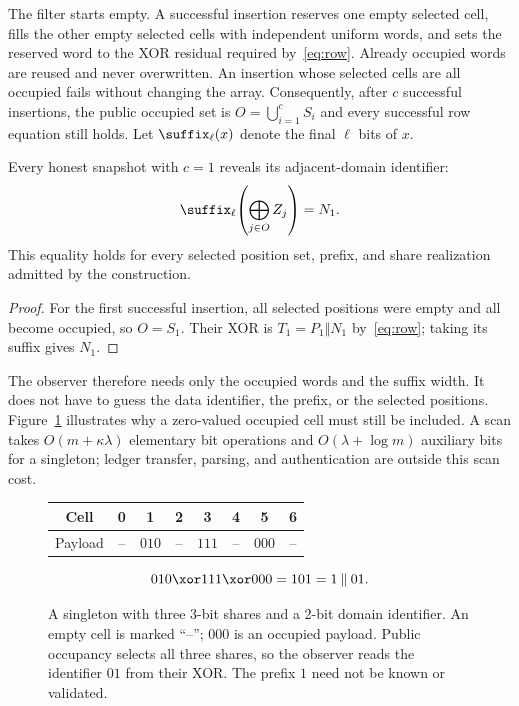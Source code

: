The filter starts empty. A successful insertion reserves one empty selected
cell, fills the other empty selected cells with independent uniform words,
and sets the reserved word to the XOR residual required by~\eqref{eq:row}.
Already occupied words are reused and never overwritten. An insertion whose
selected cells are all occupied fails without changing the array. Consequently,
after $c$ successful insertions, the public occupied set is
$O=\bigcup_{i=1}^{c}S_i$ and every successful row equation still holds.
Let $\suffix_\ell(x)$ denote the final $\ell$ bits of $x$.

\begin{proposition}
\label{prop:singleton}
Every honest snapshot with $c=1$ reveals its adjacent-domain identifier:
\begin{equation}
  \suffix_\ell\!\left(\bigoplus_{j\in O}Z_j\right)=N_1.
  \label{eq:singleton}
\end{equation}
This equality holds for every selected position set, prefix, and share
realization admitted by the construction.
\end{proposition}

\begin{proof}
For the first successful insertion, all selected positions were empty and
all become occupied, so $O=S_1$. Their XOR is $T_1=P_1\Vert N_1$
by~\eqref{eq:row}; taking its suffix gives $N_1$.
\end{proof}

The observer therefore needs only the occupied words and the suffix width.
It does not have to guess the data identifier, the prefix, or the selected
positions. Figure~\ref{fig:example} illustrates why a zero-valued occupied
cell must still be included. A scan takes
$O(m+\kappa\lambda)$ elementary bit operations and
$O(\lambda+\log m)$ auxiliary bits for a singleton; ledger transfer,
parsing, and authentication are outside this scan cost.

\begin{figure}[ht]
\centering
\begin{tabular}{c*{7}{c}}
\toprule
Cell & 0 & 1 & 2 & 3 & 4 & 5 & 6\\
\midrule
Payload & -- & $010$ & -- & $111$ & -- & $000$ & --\\
\bottomrule
\end{tabular}
\[
  010\xor111\xor000=101=1\mathbin\Vert01.
\]
\caption{A singleton with three 3-bit shares and a 2-bit domain identifier.
An empty cell is marked ``--''; $000$ is an occupied payload. Public occupancy
selects all three shares, so the observer reads the identifier $01$ from their
XOR. The prefix $1$ need not be known or validated.}
\label{fig:example}
\end{figure}

